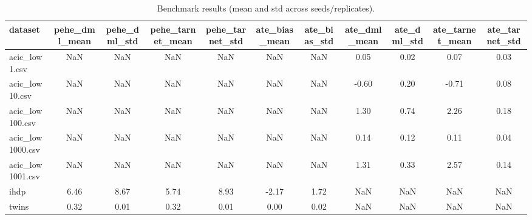 \begin{table}[t]
\centering
\caption{Benchmark results (mean and std across seeds/replicates).}
\label{tab:benchmarks}
\begin{tabular}{lcccccccccc}
\toprule
dataset & pehe_dml_mean & pehe_dml_std & pehe_tarnet_mean & pehe_tarnet_std & ate_bias_mean & ate_bias_std & ate_dml_mean & ate_dml_std & ate_tarnet_mean & ate_tarnet_std \\
\midrule
\midrule
acic_low1.csv & NaN & NaN & NaN & NaN & NaN & NaN & 0.05 & 0.02 & 0.07 & 0.03 \\
\toprule
acic_low10.csv & NaN & NaN & NaN & NaN & NaN & NaN & -0.60 & 0.20 & -0.71 & 0.08 \\
acic_low100.csv & NaN & NaN & NaN & NaN & NaN & NaN & 1.30 & 0.74 & 2.26 & 0.18 \\
acic_low1000.csv & NaN & NaN & NaN & NaN & NaN & NaN & 0.14 & 0.12 & 0.11 & 0.04 \\
acic_low1001.csv & NaN & NaN & NaN & NaN & NaN & NaN & 1.31 & 0.33 & 2.57 & 0.14 \\
ihdp & 6.46 & 8.67 & 5.74 & 8.93 & -2.17 & 1.72 & NaN & NaN & NaN & NaN \\
twins & 0.32 & 0.01 & 0.32 & 0.01 & 0.00 & 0.02 & NaN & NaN & NaN & NaN \\
\bottomrule
\bottomrule
\end{tabular}
\end{table}